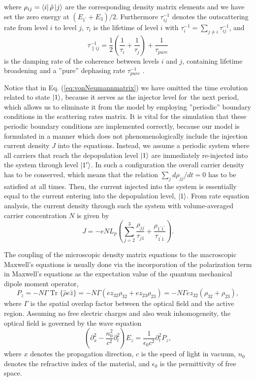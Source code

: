 \documentclass[10pt,letterpaper]{article}%
\DeclareMathOperator{\Tr}{Tr}
\begin{document}
where $\rho_{ij}=\Bra{i}\hat{\rho}\Ket{j}$ are the corresponding density
matrix elements and we have set the zero energy at $(E_{1^{\prime}}+E_{3})/2$.
Furthermore $\tau_{ij}^{-1}$ denotes the outscattering rate from level $i$ to
level $j$, $\tau_{i}$ is the lifetime of level $i$ with $\tau_{i}^{-1}%
=\sum_{j\neq i}\tau_{ij}^{-1}$, and
\[
\tau_{\parallel ij}^{-1}=\frac{1}{2}\left(  \frac{1}{\tau_{i}}+\frac{1}%
{\tau_{j}}\right)  +\frac{1}{\tau_{pure}}%
\]
is the damping rate of the coherence between levels $i$ and $j$, containing
lifetime broadening and a ''pure'' dephasing rate $\tau_{pure}^{-1}$
\cite{callebaut2005importance}.

Notice that in Eq. (\ref{eq:vonNeumannmatrix}) we have omitted the time
evolution related to state $\Ket{1}$, because it serves as the injector level
for\ the next period, which allows us to eliminate it from the model by
employing ''periodic'' boundary conditions in the scattering rates matrix. It
is vital for the simulation that these periodic boundary conditions are
implemented correctly, because our model is formulated in a manner which does
not phenomenologically include the injection current density $J$ into the
equations. Instead, we assume a periodic system where all carriers that reach
the depopulation level $\Ket{1}$ are immediately re-injected into the system
through level $\Ket{1'}$. In such a configuration the overall carrier density
has to be conserved, which means that the relation $\sum_{j}d\rho_{jj}/dt=0$
has to be satisfied at all times. Then, the current injected into the system
is essentially equal to the current entering into the depopulation level,
$\Ket{1}$. From rate equation analysis, the current density through such the
system with volume-averaged carrier concentration $N$ is given by
\cite{kumar2009coherence}\textrm{ }%
\begin{equation}
J=-eNL_{p}\left(  \sum_{j=2}^{3}\frac{\rho_{jj}}{\tau_{j1}}+\frac
{\rho_{1^{\prime}1^{\prime}}}{\tau_{1^{\prime}1}}\right)  .
\end{equation}

The coupling of the microscopic density matrix equations to the macroscopic
Maxwell's equations is usually done via the incorporation of the polarization
term in Maxwell's equations as the expectation value of the quantum mechanical
dipole moment operator,
\begin{equation}
P_{z}=-N\Gamma\Tr\{\hat{\rho}e\hat{z}\}=-N\Gamma(ez_{32}\rho_{32}+ez_{23}%
\rho_{23})=-N\Gamma ez_{32}(\rho_{32}+\rho_{23}), \label{eq:fullpolarization}%
\end{equation}
where $\Gamma$ is the spatial overlap factor between the optical field and the
active region. Assuming no free electric charges and also weak inhomogeneity,
the optical field is governed by the wave equation
\cite{boyd2003nonlinear,jirauschek2014modeling}
\begin{equation}
\left(  \partial_{x}^{2}-\frac{n_{0}^{2}}{c^{2}}\partial_{t}^{2}\right)
E_{z}=\frac{1}{\epsilon_{0}c^{2}}\partial_{t}^{2}P_{z}, \label{eq:fullwave}%
\end{equation}
where $x$ denotes the propagation direction, $c$ is the speed of light in
vacuum, $n_{0}$ denotes the refractive index of the material, and
$\epsilon_{0}$ is the permittivity of free space. 
\end{document}
